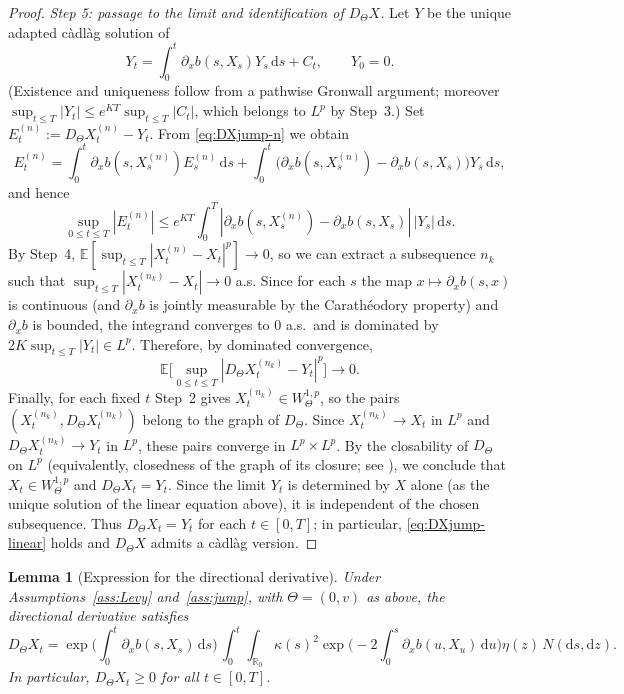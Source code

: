 \documentclass[11pt]{article}
\newcommand{\R}{\mathbb{R}}
\newcommand{\E}{\mathbb{E}}
\newcommand{\1}{\mathbf{1}}
\newcommand{\dd}{\mathrm{d}}
\theoremstyle{plain}
\newtheorem{lemma}[theorem]{Lemma}
\theoremstyle{definition}
\theoremstyle{remark}
\begin{document}
\begin{proof}
\medskip
\noindent\emph{Step 5: passage to the limit and identification of $D_\Theta X$.}
Let $Y$ be the unique adapted c\`adl\`ag solution of
\[
Y_t=\int_0^t \partial_x b(s,X_s)Y_s\,\dd s + C_t,\qquad Y_0=0.
\]
(Existence and uniqueness follow from a pathwise Gronwall argument;
moreover $\sup_{t\le T}|Y_t|\le e^{KT}\sup_{t\le T}|C_t|$, which belongs to $L^p$ by Step~3.)
Set $E^{(n)}_t:=D_\Theta X^{(n)}_t-Y_t$.
From \eqref{eq:DXjump-n} we obtain
\[
E^{(n)}_t=\int_0^t \partial_x b(s,X^{(n)}_s)E^{(n)}_s\,\dd s +\int_0^t\big(\partial_x b(s,X^{(n)}_s)-\partial_x b(s,X_s)\big)Y_s\,\dd s,
\]
and hence
\[
\sup_{0\le t\le T}|E^{(n)}_t|
\le e^{KT}\int_0^T|\partial_x b(s,X^{(n)}_s)-\partial_x b(s,X_s)|\,|Y_s|\,\dd s.
\]
By Step~4, $\E[\sup_{t\le T}|X^{(n)}_t-X_t|^p]\to 0$, so we can extract a subsequence $n_k$ such that
$\sup_{t\le T}|X^{(n_k)}_t-X_t|\to0$ a.s.
Since for each $s$ the map $x\mapsto \partial_x b(s,x)$ is continuous (and $\partial_x b$ is jointly measurable by the Carath\'eodory property) and $\partial_x b$ is bounded, the integrand converges to $0$ a.s.\ and is dominated by $2K\sup_{t\le T}|Y_t|\in L^p$.
Therefore, by dominated convergence,
\[
\E\Big[\sup_{0\le t\le T}|D_\Theta X^{(n_k)}_t-Y_t|^p\Big]\to0.
\]
Finally, for each fixed $t$ Step~2 gives $X^{(n_k)}_t\in W^{1,p}_\Theta$, so the pairs $(X^{(n_k)}_t, D_\Theta X^{(n_k)}_t)$ belong to the graph of $D_\Theta$.
Since $X^{(n_k)}_t\to X_t$ in $L^p$ and $D_\Theta X^{(n_k)}_t\to Y_t$ in $L^p$, these pairs converge in $L^p\times L^p$.
By the closability of $D_\Theta$ on $L^p$ (equivalently, closedness of the graph of its closure; see \cite[Section~3]{NakagawaSuzuki2024}),
we conclude that $X_t\in W^{1,p}_\Theta$ and $D_\Theta X_t=Y_t$.
Since the limit $Y_t$ is determined by $X$ alone (as the unique solution of the linear equation above), it is independent of the chosen subsequence.
Thus $D_\Theta X_t=Y_t$ for each $t\in[0,T]$; in particular, \eqref{eq:DXjump-linear} holds and $D_\Theta X$ admits a c\`adl\`ag version.
\end{proof}


\begin{lemma}[Expression for the directional derivative]\label{lem:DX-jump-expression}
Under Assumptions~\ref{ass:Levy} and~\ref{ass:jump}, with $\Theta=(0,v)$ as above,
the directional derivative satisfies
\begin{equation}\label{eq:DXjump}
D_\Theta X_t
= \exp\Big(\int_0^t \partial_x b(s,X_s)\,\dd s\Big)\,
\int_0^t\int_{\R_0}
\kappa(s)^2\exp\Big(-2\int_0^s \partial_x b(u,X_u)\,\dd u\Big)\eta(z)\,N(\dd s,\dd z).
\end{equation}
In particular, $D_\Theta X_t\ge 0$ for all $t\in[0,T]$.
\end{lemma}
\end{document}
